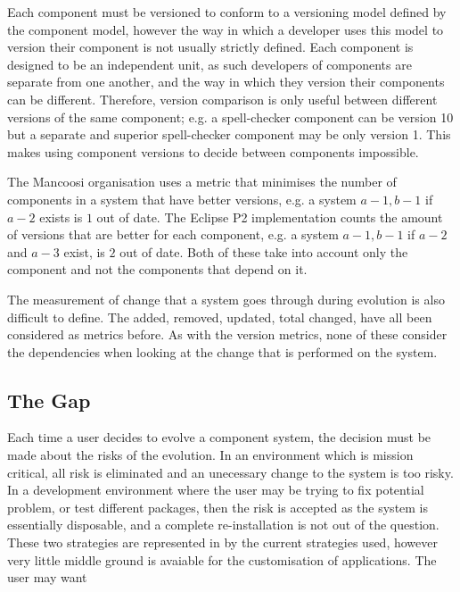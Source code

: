 Each component must be versioned to conform to a versioning model defined by the component model, 
however the way in which a developer uses this model to version their component is not usually strictly defined.
Each component is designed to be an independent unit, as such developers of components are separate from one another,
and the way in which they version their components can be different.
Therefore, version comparison is only useful between different versions of the same component;
e.g. a spell-checker component can be version 10 but a separate and superior spell-checker component may be only version 1.
This makes using component versions to decide between components impossible.


The Mancoosi organisation uses a metric that minimises the number of components in a system that have better versions, 
e.g. a system $a-1,b-1$ if $a-2$ exists is $1$ out of date. 
The Eclipse P2 implementation counts the amount of versions that are better for each component,
e.g. a system $a-1,b-1$ if $a-2$ and $a-3$ exist, is $2$ out of date.
Both of these take into account only the component and not the components that depend on it.

The measurement of change that a system goes through during evolution is also difficult to define.
The added, removed, updated, total changed, have all been considered as metrics before. 
As with the version metrics, none of these consider the dependencies when looking at the change that is performed on the system.


\subsection{The Gap}
Each time a user decides to evolve a component system, the decision must be made about the risks of the evolution.
In an environment which is mission critical, all risk is eliminated and an unecessary change to the system is too risky.
In a development environment where the user may be trying to fix potential problem, 
or test different packages, then the risk is accepted as the system is essentially disposable, and a complete re-installation is not out of the question.
These two strategies are represented in by the current strategies used, however very little middle ground is avaiable for the customisation of applications.
The user may want 